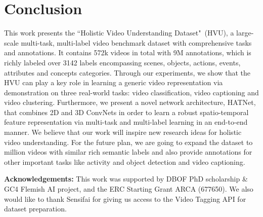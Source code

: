 \documentclass[runningheads]{llncs}
\begin{document}
\begin{table}[t] 
\centering
\small
\tabcolsep=0.15cm
\caption{Video clustering performance: evaluation based on extracted features from networks pre-trained on Kinetics and HVU datasets.} \label{table:cluster}
\vspace{-0.8cm}
\end{table}







 
\section{Conclusion}
This work presents the ``Holistic Video Understanding Dataset"~(HVU), a large-scale multi-task, multi-label video benchmark dataset with comprehensive tasks and annotations.  It contains 572k videos in total with 9M annotations, which is richly labeled over {3142} labels encompassing scenes, objects, actions, events, attributes  and concepts categories. Through our experiments, we show that the HVU can play a key role in learning a generic video representation via demonstration on three real-world tasks: video classification, video captioning and video clustering. Furthermore, we present a novel network architecture, HATNet, that combines 2D and 3D ConvNets in order to learn a robust spatio-temporal feature representation via multi-task and multi-label learning in an end-to-end manner. We believe that our work will inspire new research ideas for holistic video understanding. For the future plan, we are going to expand the dataset to  million videos with similar rich semantic labels and also provide annotations for other important tasks like activity and object detection and video captioning.






\textbf{Acknowledgements:} This work was supported by DBOF PhD scholarship \& GC4 Flemish AI project, and the ERC Starting Grant ARCA (677650). We also would like to thank Sensifai for giving us access to the Video Tagging API for dataset preparation.

{\small


}
\end{document}
